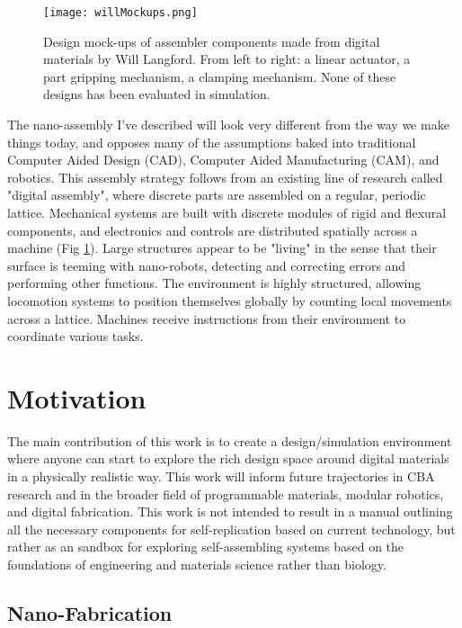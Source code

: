 {\begin{figure}
  \texttt{[image: willMockups.png]}
  \caption{Design mock-ups of assembler components made from digital materials by Will Langford.  From left to right: a linear actuator, a part gripping mechanism, a clamping mechanism.  None of these designs has been evaluated in simulation.}
  \label{fig:willMockups}
\end{figure}
The nano-assembly I've described will look very different from the way we make things today, and opposes many of the assumptions baked into traditional Computer Aided Design (CAD),  Computer Aided Manufacturing (CAM), and robotics.  This assembly strategy follows from an existing line of research called "digital assembly", where discrete parts are assembled on a regular, periodic lattice.  Mechanical systems are built with discrete modules of rigid and flexural components, and electronics and controls are distributed spatially across a machine (Fig \ref{fig:willMockups}).  Large structures appear to be "living" in the sense that their surface is teeming with nano-robots, detecting and correcting errors and performing other functions.  The environment is highly structured, allowing locomotion systems to position themselves globally by counting local movements across a lattice.  Machines receive instructions from their environment to coordinate various tasks.
\\

\section{Motivation}

The main contribution of this work is to create a design/simulation environment where anyone can start to explore the rich design space around digital materials in a physically realistic way.  This work will inform future trajectories in CBA research and in the broader field of programmable materials, modular robotics, and digital fabrication.  This work is not intended to result in a manual outlining all the necessary components for self-replication based on current technology, but rather as an sandbox for exploring self-assembling systems based on the foundations of engineering and materials science rather than biology.

\subsection{Nano-Fabrication}

}
